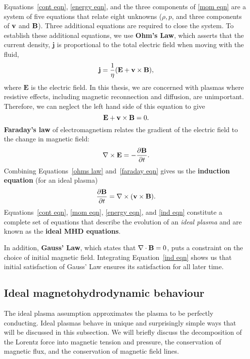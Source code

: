 \documentclass[12pt]{../style-files/ociamthesis}
\begin{document}
Equations~\eqref{cont eqn}, \eqref{energy eqn}, and the three components of \eqref{mom eqn} are a system of five equations that relate eight unknowns ($\rho, p$, and three components of $\mathbf{v}$ and $\mathbf{B}$). Three additional equations are required to close the system. To establish these additional equations, we use \textbf{Ohm's Law}, which asserts that the current density, $\mathbf{j}$ is proportional to the total electric field when moving with the fluid,
\begin{equation}
	\mathbf{j} = \frac{1}{\eta}(\mathbf{E} + \mathbf{v}\times\mathbf{B}),
\end{equation}
where $\mathbf{E}$ is the electric field. In this thesis, we are concerned with plasmas where resistive effects, including magnetic reconnection and diffusion, are unimportant. Therefore, we can neglect the left hand side of this equation to give
\begin{equation}
\mathbf{E} + \mathbf{v}\times\mathbf{B} = 0. \label{ohms law}
\end{equation}
\textbf{Faraday's law} of electromagnetism relates the gradient of the electric field to the change in magnetic field:
\begin{equation}
	\nabla\times\mathbf{E} = -\frac{\partial\mathbf{B}}{\partial t}. \label{faraday eqn}
\end{equation}
Combining Equations~\eqref{ohms law} and~\eqref{faraday eqn} gives us the \textbf{induction equation} (for an ideal plasma)
\begin{equation}
	\frac{\partial\mathbf{B}}{\partial t} = \nabla\times(\mathbf{v}\times\mathbf{B}). \label{ind eqn}
\end{equation}
Equations~\eqref{cont eqn}, \eqref{mom eqn}, \eqref{energy eqn}, and \eqref{ind eqn} constitute a complete set of equations that describe the evolution of an \textit{ideal plasma} and are known as the \textbf{ideal MHD equations}.

In addition, \textbf{Gauss' Law}, which states that $\nabla\cdot\mathbf{B} = 0$, puts a constraint on the choice of initial magnetic field. Integrating Equation~\eqref{ind eqn} shows us that initial satisfaction of Gauss' Law ensures its satisfaction for all later time.


\subsection{Ideal magnetohydrodynamic behaviour}
The ideal plasma assumption approximates the plasma to be perfectly conducting. Ideal plasmas behave in unique and surprisingly simple ways that will be discussed in this subsection. We will briefly discuss the decomposition of the Lorentz force into magnetic tension and pressure, the conservation of magnetic flux, and the conservation of magnetic field lines.
\end{document}
